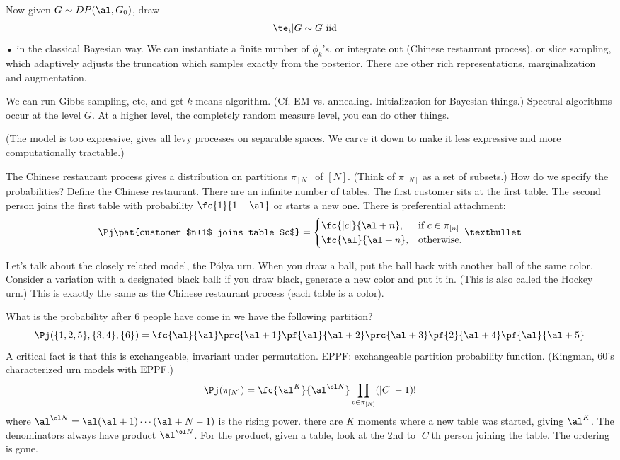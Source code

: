Now given $G\sim DP(\al,G_0)$, draw 
\begin{align}
\te_i|G&\sim G\text{ iid}
\end{align}•
in the classical Bayesian way.
We can instantiate a finite number of $\phi_k$'s, or integrate out (Chinese restaurant process), or slice sampling, which adaptively adjusts the truncation which samples exactly from the posterior.
There are other rich representations, marginalization and augmentation.

We can run Gibbs sampling, etc, and get $k$-means algorithm. (Cf. EM vs. annealing. Initialization for Bayesian things.)
 Spectral algorithms occur at the level $G$. At a higher level, the completely random measure level, you can do other things.

(The model is too expressive, gives all levy processes on separable spaces.
We carve it down to make it less expressive and more computationally tractable.)

The Chinese restaurant process gives a distribution on partitions $\pi_{[N]}$ of $[N]$. (Think of $\pi_{[N]}$ as a set of subsets.)
%
How do we specify the probabilities?
Define the Chinese restaurant. There are an infinite number of tables. 
The first customer sits at the first table. The second person joins the first table with probability $\fc{1}{1+\al}$ or starts a new one. There is preferential attachment: 
$$
\Pj\pat{customer $n+1$ joins table $c$} = 
\begin{cases}
\fc{|c|}{\al + n},&\text{if }c\in \pi_{[n]}\\
\fc{\al}{\al + n}, &\text{otherwise}.
\end{cases}•
$$

Let's talk about the closely related model, the P\'olya urn. When you draw a ball, put the ball  back with another ball of the same color. Consider a variation with a designated black ball: if you draw black, generate a new color and put it in. (This is also called the Hockey urn.) This is exactly the same as the Chinese restaurant process (each table is a color).

What is the probability after 6 people have come in we have the following partition?
$$
\Pj(\{1,2,5\}, \{3,4\}, \{6\}) = 
\fc{\al}{\al}\prc{\al + 1} \pf{\al}{\al+2}\prc{\al+3} \pf{2}{\al+ 4} \pf{\al}{\al+5}
$$
A critical fact is that this is exchangeable, invariant under permutation. EPPF: exchangeable partition probability function. (Kingman, 60's characterized urn models with EPPF.) %
$$
\Pj(\pi_{[N]}) = \fc{\al^K}{\al^{\ol N}} \prod_{c\in \pi_{[N]}} (|C|-1)!
$$
where $\al^{\ol N} = \al(\al+1)\cdots (\al + N-1)$ is the rising power.
there are $K$ moments where a new table was started, giving $\al^K$. The denominators always have product $\al^{\ol N}$. For the product, given a table, look at the 2nd to $|C|$th person joining the table. The ordering is gone.

